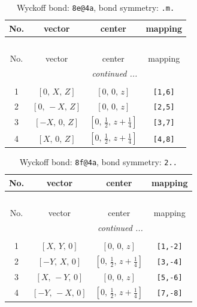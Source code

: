 \documentclass[fleqn,8pt]{jsarticle}
\begin{document}
\renewcommand{\arraystretch}{1.2}
\begin{longtable}{cccc}
\caption{Wyckoff bond: {\tt 8e@4a}, bond symmetry: {\tt .m.}}
 \\
 \hline \hline
No. & vector & center & mapping \\ \hline \endfirsthead

\multicolumn{3}{l}{\tablename\ \thetable{}} \\
 \hline \hline
No. & vector & center & mapping \\ \hline \endhead

 \hline \hline
\multicolumn{3}{r}{\footnotesize\it continued ...} \\ \endfoot

 \hline \hline
\multicolumn{3}{r}{} \\ \endlastfoot

1 & $\left[ 0,\, X,\, Z \right]$ & $\left[ 0,\, 0,\, z \right]$ & {\tt [1,6]} \\ \hline
2 & $\left[ 0,\, - X,\, Z \right]$ & $\left[ 0,\, 0,\, z \right]$ & {\tt [2,5]} \\ \hline
3 & $\left[ - X,\, 0,\, Z \right]$ & $\left[ 0,\, \frac{1}{2},\, z + \frac{1}{4} \right]$ & {\tt [3,7]} \\ \hline
4 & $\left[ X,\, 0,\, Z \right]$ & $\left[ 0,\, \frac{1}{2},\, z + \frac{1}{4} \right]$ & {\tt [4,8]} \\
\end{longtable}
\renewcommand{\arraystretch}{1.2}
\begin{longtable}{cccc}
\caption{Wyckoff bond: {\tt 8f@4a}, bond symmetry: {\tt 2..}}
 \\
 \hline \hline
No. & vector & center & mapping \\ \hline \endfirsthead

\multicolumn{3}{l}{\tablename\ \thetable{}} \\
 \hline \hline
No. & vector & center & mapping \\ \hline \endhead

 \hline \hline
\multicolumn{3}{r}{\footnotesize\it continued ...} \\ \endfoot

 \hline \hline
\multicolumn{3}{r}{} \\ \endlastfoot

1 & $\left[ X,\, Y,\, 0 \right]$ & $\left[ 0,\, 0,\, z \right]$ & {\tt [1,-2]} \\ \hline
2 & $\left[ - Y,\, X,\, 0 \right]$ & $\left[ 0,\, \frac{1}{2},\, z + \frac{1}{4} \right]$ & {\tt [3,-4]} \\ \hline
3 & $\left[ X,\, - Y,\, 0 \right]$ & $\left[ 0,\, 0,\, z \right]$ & {\tt [5,-6]} \\ \hline
4 & $\left[ - Y,\, - X,\, 0 \right]$ & $\left[ 0,\, \frac{1}{2},\, z + \frac{1}{4} \right]$ & {\tt [7,-8]} \\
\end{longtable}
\end{document}
